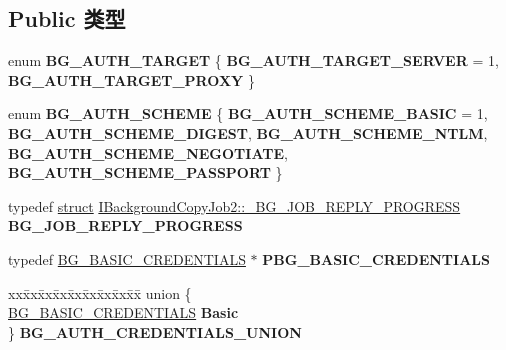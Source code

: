 \subsection*{Public 类型}
\begin{DoxyCompactItemize}
\item 
\mbox{\label{interface_i_background_copy_job2_a00a18f569e1a22178c448e96e912fcb0}} 
enum {\bfseries B\+G\+\_\+\+A\+U\+T\+H\+\_\+\+T\+A\+R\+G\+ET} \{ {\bfseries B\+G\+\_\+\+A\+U\+T\+H\+\_\+\+T\+A\+R\+G\+E\+T\+\_\+\+S\+E\+R\+V\+ER} = 1, 
{\bfseries B\+G\+\_\+\+A\+U\+T\+H\+\_\+\+T\+A\+R\+G\+E\+T\+\_\+\+P\+R\+O\+XY}
 \}
\item 
\mbox{\label{interface_i_background_copy_job2_aea00834f1fb31158c47f57df9627ad7b}} 
enum {\bfseries B\+G\+\_\+\+A\+U\+T\+H\+\_\+\+S\+C\+H\+E\+ME} \{ \newline
{\bfseries B\+G\+\_\+\+A\+U\+T\+H\+\_\+\+S\+C\+H\+E\+M\+E\+\_\+\+B\+A\+S\+IC} = 1, 
{\bfseries B\+G\+\_\+\+A\+U\+T\+H\+\_\+\+S\+C\+H\+E\+M\+E\+\_\+\+D\+I\+G\+E\+ST}, 
{\bfseries B\+G\+\_\+\+A\+U\+T\+H\+\_\+\+S\+C\+H\+E\+M\+E\+\_\+\+N\+T\+LM}, 
{\bfseries B\+G\+\_\+\+A\+U\+T\+H\+\_\+\+S\+C\+H\+E\+M\+E\+\_\+\+N\+E\+G\+O\+T\+I\+A\+TE}, 
\newline
{\bfseries B\+G\+\_\+\+A\+U\+T\+H\+\_\+\+S\+C\+H\+E\+M\+E\+\_\+\+P\+A\+S\+S\+P\+O\+RT}
 \}
\item 
\mbox{\label{interface_i_background_copy_job2_a513db1f52cce5e2bfbc9b142b02a4e36}} 
typedef \hyperlink{interfacestruct}{struct} \hyperlink{struct_i_background_copy_job2_1_1___b_g___j_o_b___r_e_p_l_y___p_r_o_g_r_e_s_s}{I\+Background\+Copy\+Job2\+::\+\_\+\+B\+G\+\_\+\+J\+O\+B\+\_\+\+R\+E\+P\+L\+Y\+\_\+\+P\+R\+O\+G\+R\+E\+SS} {\bfseries B\+G\+\_\+\+J\+O\+B\+\_\+\+R\+E\+P\+L\+Y\+\_\+\+P\+R\+O\+G\+R\+E\+SS}
\item 
\mbox{\label{interface_i_background_copy_job2_aef7645a680e6004f8b7af59fa0d50896}} 
typedef \hyperlink{struct_i_background_copy_job2_1_1_b_g___b_a_s_i_c___c_r_e_d_e_n_t_i_a_l_s}{B\+G\+\_\+\+B\+A\+S\+I\+C\+\_\+\+C\+R\+E\+D\+E\+N\+T\+I\+A\+LS} $\ast$ {\bfseries P\+B\+G\+\_\+\+B\+A\+S\+I\+C\+\_\+\+C\+R\+E\+D\+E\+N\+T\+I\+A\+LS}
\item 
\mbox{\label{interface_i_background_copy_job2_adbc3987e4f71fd18156ef656b8daab0c}} 
\begin{tabbing}
xx\=xx\=xx\=xx\=xx\=xx\=xx\=xx\=xx\=\kill
union \{\\
\>\hyperlink{struct_i_background_copy_job2_1_1_b_g___b_a_s_i_c___c_r_e_d_e_n_t_i_a_l_s}{BG\_BASIC\_CREDENTIALS} {\bfseries Basic}\\
\} {\bfseries BG\_AUTH\_CREDENTIALS\_UNION}\\


\end{tabbing}
\end{DoxyCompactItemize}
